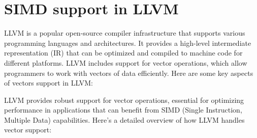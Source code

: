 \section{SIMD support in LLVM}
\label{sec:llvm-vectors}

LLVM is a popular open-source compiler infrastructure that supports
various programming languages and architectures. It provides a
high-level intermediate representation (IR) that can be optimized and
compiled to machine code for different platforms. LLVM includes
support for vector operations, which allow programmers to work with
vectors of data efficiently. Here are some key aspects of vectors
support in LLVM:

LLVM provides robust support for vector operations, essential for
optimizing performance in applications that can benefit from SIMD
(Single Instruction, Multiple Data) capabilities. Here’s a detailed
overview of how LLVM handles vector support:


